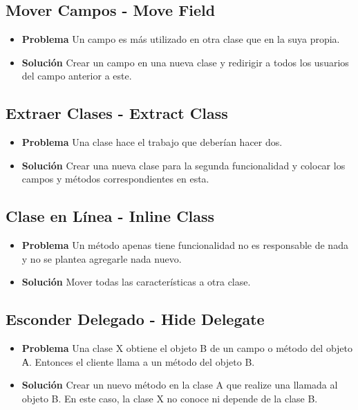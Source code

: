 \documentclass[11pt,a4paper,oneside]{book}
\begin{document}
\subsection{Mover Campos - Move Field}
\begin{itemize}
    \item \textbf{Problema} Un campo es más utilizado en otra clase que en la suya propia.
    \item \textbf{Solución} Crear un campo en una nueva clase y redirigir a todos los usuarios del campo anterior a este.
\end{itemize}
    
\subsection{Extraer Clases - Extract Class}
\begin{itemize}
    \item \textbf{Problema} Una clase hace el trabajo que deberían hacer dos.
    \item \textbf{Solución} Crear una nueva clase para la segunda funcionalidad y colocar los campos y métodos correspondientes en esta.
\end{itemize}
    
\subsection{Clase en Línea - Inline Class}
\begin{itemize}
    \item \textbf{Problema} Un método apenas tiene funcionalidad no es responsable de nada y no se plantea agregarle nada nuevo.
    \item \textbf{Solución} Mover todas las características a otra clase.
\end{itemize}
    
\subsection{Esconder Delegado - Hide Delegate}
 \begin{itemize}
    \item \textbf{Problema} Una clase X obtiene el objeto B de un campo o método del objeto А. Entonces el cliente llama a un método del objeto B.
    \item \textbf{Solución} Crear un nuevo método en la clase A que realize una llamada al objeto B. En este caso, la clase X no conoce ni depende de la clase B.
\end{itemize}
\end{document}
